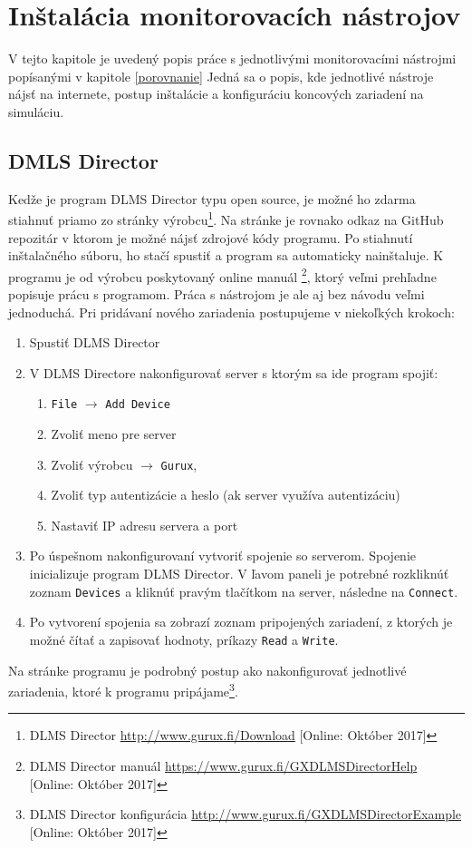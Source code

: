 \chapter{Inštalácia monitorovacích nástrojov}
\label{Ako}

\tab V tejto kapitole je uvedený popis práce s jednotlivými monitorovacími nástrojmi popísanými v kapitole \ref{porovnanie} Jedná sa o popis, kde jednotlivé nástroje nájsť na internete, postup inštalácie a konfiguráciu koncových zariadení na simuláciu.

\section{DMLS Director}
\label{Ako_DLMS}
\tab Kedže je program DLMS Director typu open source, je možné ho zdarma stiahnuť priamo zo stránky výrobcu\footnote{DLMS Director \url{http://www.gurux.fi/Download} [Online: Október 2017]}. Na stránke je rovnako odkaz na GitHub repozitár v ktorom je možné nájsť zdrojové kódy programu. Po stiahnutí inštalačného súboru, ho stačí spustiť a program sa automaticky nainštaluje. K programu je od výrobcu poskytovaný online manuál \footnote{DLMS Director manuál \url{https://www.gurux.fi/GXDLMSDirectorHelp} [Online: Október 2017]}, ktorý veľmi prehľadne popisuje prácu s programom. Práca s nástrojom je ale aj bez návodu veľmi jednoduchá. Pri pridávaní nového zariadenia postupujeme v niekoľkých krokoch:
\begin{enumerate}
\item Spustiť DLMS Director
\item V DLMS Directore nakonfigurovať server s ktorým sa ide program spojiť:
\begin{enumerate}
\item {\tt File} $\rightarrow$ {\tt Add Device}
\item Zvoliť meno pre server
\item Zvoliť výrobcu $\rightarrow$ {\tt Gurux}, 
\item Zvoliť typ autentizácie a heslo (ak server využíva autentizáciu)
\item Nastaviť IP adresu servera a port
\end{enumerate}
\item Po úspešnom nakonfigurovaní vytvoriť spojenie so serverom. Spojenie inicializuje program DLMS Director. V ľavom paneli je potrebné rozkliknúť zoznam {\tt Devices} a kliknúť pravým tlačítkom na server, následne na {\tt Connect}.
\item Po vytvorení spojenia sa zobrazí zoznam pripojených zariadení, z ktorých je možné čítať a zapisovať hodnoty, príkazy {\tt Read} a {\tt Write}.
\end{enumerate} \par
Na stránke programu je podrobný postup ako nakonfigurovať jednotlivé zariadenia, ktoré k programu pripájame\footnote{DLMS Director konfigurácia \url{http://www.gurux.fi/GXDLMSDirectorExample} [Online: Október 2017]}.

